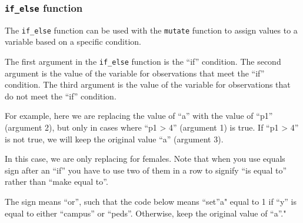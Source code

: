 \documentclass[]{book}
\newenvironment{Shaded}{\begin{snugshade}}{\end{snugshade}}
\newcommand{\DataTypeTok}[1]{\textcolor[rgb]{0.13,0.29,0.53}{#1}}
\newcommand{\DecValTok}[1]{\textcolor[rgb]{0.00,0.00,0.81}{#1}}
\newcommand{\KeywordTok}[1]{\textcolor[rgb]{0.13,0.29,0.53}{\textbf{#1}}}
\newcommand{\NormalTok}[1]{#1}
\newcommand{\OperatorTok}[1]{\textcolor[rgb]{0.81,0.36,0.00}{\textbf{#1}}}
\newcommand{\StringTok}[1]{\textcolor[rgb]{0.31,0.60,0.02}{#1}}
\begin{document}
\hypertarget{if_else-function}{%
\subsubsection{\texorpdfstring{\texttt{if\_else}
function}{if\_else function}}\label{if_else-function}}

The \texttt{if\_else} function can be used with the \texttt{mutate}
function to assign values to a variable based on a specific condition.

The first argument in the \texttt{if\_else} function is the ``if''
condition. The second argument is the value of the variable for
observations that meet the ``if'' condition. The third argument is the
value of the variable for observations that do not meet the ``if''
condition.

For example, here we are replacing the value of ``a'' with the value of
``p1'' (argument 2), but only in cases where ``p1 \textgreater{} 4''
(argument 1) is true. If ``p1 \textgreater{} 4'' is not true, we will
keep the original value ``a'' (argument 3).

\begin{Shaded}
\end{Shaded}

In this case, we are only replacing for females. Note that when you use
equals sign after an ``if'' you have to use two of them in a row to
signify ``is equal to'' rather than ``make equal to''.

\begin{Shaded}
\end{Shaded}

The \texttt{\textbar{}} sign means ``or'', such that the code below
means ``set''a" equal to 1 if ``y'' is equal to either ``campus'' or
``peds''. Otherwise, keep the original value of ``a''."
\end{document}
